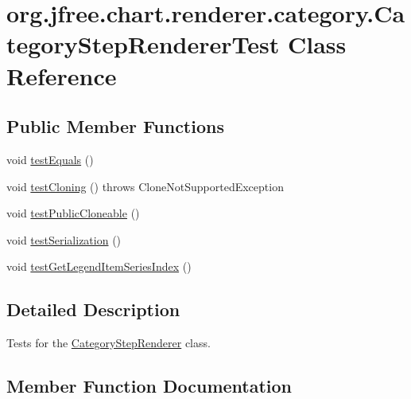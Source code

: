 \hypertarget{classorg_1_1jfree_1_1chart_1_1renderer_1_1category_1_1_category_step_renderer_test}{}\section{org.\+jfree.\+chart.\+renderer.\+category.\+Category\+Step\+Renderer\+Test Class Reference}
\label{classorg_1_1jfree_1_1chart_1_1renderer_1_1category_1_1_category_step_renderer_test}
\subsection*{Public Member Functions}
\begin{DoxyCompactItemize}
\item 
void \mbox{\hyperlink{classorg_1_1jfree_1_1chart_1_1renderer_1_1category_1_1_category_step_renderer_test_aa9fe65fe9f75d38f5dfab3f92f7355ed}{test\+Equals}} ()
\item 
void \mbox{\hyperlink{classorg_1_1jfree_1_1chart_1_1renderer_1_1category_1_1_category_step_renderer_test_a5200d15eac5fe91e5cc03f701cbbf46d}{test\+Cloning}} ()  throws Clone\+Not\+Supported\+Exception 
\item 
void \mbox{\hyperlink{classorg_1_1jfree_1_1chart_1_1renderer_1_1category_1_1_category_step_renderer_test_a0fa9137fbb22ee05c4a8329c52ebb016}{test\+Public\+Cloneable}} ()
\item 
void \mbox{\hyperlink{classorg_1_1jfree_1_1chart_1_1renderer_1_1category_1_1_category_step_renderer_test_a40b32b992dffaa879ccb9d14fb0c72c1}{test\+Serialization}} ()
\item 
void \mbox{\hyperlink{classorg_1_1jfree_1_1chart_1_1renderer_1_1category_1_1_category_step_renderer_test_a6bcbaa014bbbae671d7f286cb2074435}{test\+Get\+Legend\+Item\+Series\+Index}} ()
\end{DoxyCompactItemize}


\subsection{Detailed Description}
Tests for the \mbox{\hyperlink{classorg_1_1jfree_1_1chart_1_1renderer_1_1category_1_1_category_step_renderer}{Category\+Step\+Renderer}} class. 

\subsection{Member Function Documentation}
\mbox{\label{classorg_1_1jfree_1_1chart_1_1renderer_1_1category_1_1_category_step_renderer_test_a5200d15eac5fe91e5cc03f701cbbf46d}} 
